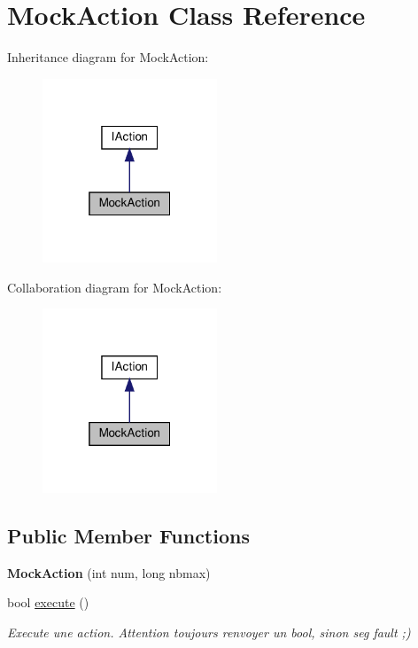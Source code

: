 \hypertarget{classMockAction}{}\section{Mock\+Action Class Reference}
\label{classMockAction}


Inheritance diagram for Mock\+Action\+:
\nopagebreak
\begin{figure}[H]
\begin{center}
\leavevmode
\includegraphics[width=148pt]{classMockAction__inherit__graph}
\end{center}
\end{figure}


Collaboration diagram for Mock\+Action\+:
\nopagebreak
\begin{figure}[H]
\begin{center}
\leavevmode
\includegraphics[width=148pt]{classMockAction__coll__graph}
\end{center}
\end{figure}
\subsection*{Public Member Functions}
\begin{DoxyCompactItemize}
\item 
\mbox{\label{classMockAction_a28a65ce4424e999f22b2c8787da71e40}} 
{\bfseries Mock\+Action} (int num, long nbmax)
\item 
bool \hyperlink{classMockAction_ad7f3909b21271f52aaa5205458925b8b}{execute} ()
\begin{DoxyCompactList}\small\item\em Execute une action. Attention toujours renvoyer un bool, sinon seg fault ;) \end{DoxyCompactList}\end{DoxyCompactItemize}

